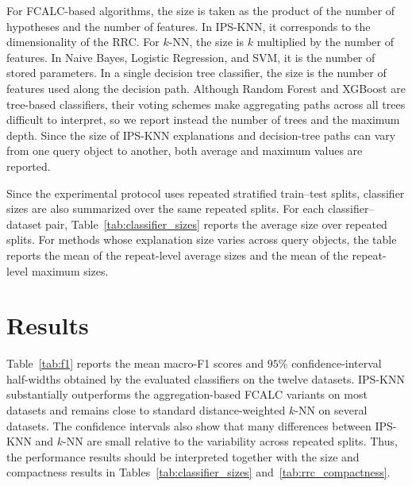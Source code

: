 \documentclass[a4paper,fleqn]{cas-sc}
\begin{document}
For FCALC-based algorithms, the size is taken as the product of the number of hypotheses and the number of features. In IPS-KNN, it corresponds to the dimensionality of the RRC. For \(k\)-NN, the size is \(k\) multiplied by the number of features. In Naive Bayes, Logistic Regression, and SVM, it is the number of stored parameters. In a single decision tree classifier, the size is the number of features used along the decision path. Although Random Forest and XGBoost are tree-based classifiers, their voting schemes make aggregating paths across all trees difficult to interpret, so we report instead the number of trees and the maximum depth. Since the size of IPS-KNN explanations and decision-tree paths can vary from one query object to another, both average and maximum values are reported.

Since the experimental protocol uses repeated stratified train--test splits, classifier sizes are also summarized over the same repeated splits. For each classifier--dataset pair, Table~\ref{tab:classifier_sizes} reports the average size over repeated splits. For methods whose explanation size varies across query objects, the table reports the mean of the repeat-level average sizes and the mean of the repeat-level maximum sizes.



\section{Results}

Table~\ref{tab:f1} reports the mean macro-F1 scores and \(95\%\) confidence-interval half-widths obtained by the evaluated classifiers on the twelve datasets. IPS-KNN substantially outperforms the aggregation-based FCALC variants on most datasets and remains close to standard distance-weighted \(k\)-NN on several datasets. The confidence intervals also show that many differences between IPS-KNN and \(k\)-NN are small relative to the variability across repeated splits. Thus, the performance results should be interpreted together with the size and compactness results in Tables~\ref{tab:classifier_sizes} and~\ref{tab:rrc_compactness}.
    
\end{document}
